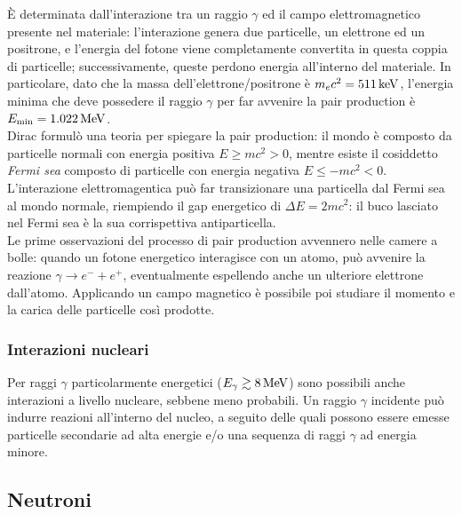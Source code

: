 È determinata dall'interazione tra un raggio $ \gamma $ ed il campo elettromagnetico presente nel materiale: l'interazione genera due particelle, un elettrone ed un positrone, e l'energia del fotone viene completamente convertita in questa coppia di particelle; successivamente, queste perdono energia all'interno del materiale. In particolare, dato che la massa dell'elettrone/positrone è $ m_ec^2 = 511\,\mathrm{keV} $, l'energia minima che deve possedere il raggio $ \gamma $ per far avvenire la pair production è $ E_{\text{min}} = 1.022\,\mathrm{MeV} $.\\
Dirac formulò una teoria per spiegare la pair production: il mondo è composto da particelle normali con energia positiva $ E \ge m c^2 > 0 $, mentre esiste il cosiddetto \textit{Fermi sea} composto di particelle con energia negativa $ E \le - m c^2 < 0 $. L'interazione elettromagentica può far transizionare una particella dal Fermi sea al mondo normale, riempiendo il gap energetico di $ \Delta E = 2mc^2 $: il buco lasciato nel Fermi sea è la sua corrispettiva antiparticella.\\
Le prime osservazioni del processo di pair production avvennero nelle camere a bolle: quando un fotone energetico interagisce con un atomo, può avvenire la reazione $ \gamma \rightarrow e^- + e^+ $, eventualmente espellendo anche un ulteriore elettrone dall'atomo. Applicando un campo magnetico è possibile poi studiare il momento e la carica delle particelle così prodotte.

\subsubsection{Interazioni nucleari}

Per raggi $ \gamma $ particolarmente energetici ($ E_{\gamma} \gtrsim 8\,\mathrm{MeV} $) sono possibili anche interazioni a livello nucleare, sebbene meno probabili. Un raggio $ \gamma $ incidente può indurre reazioni all'interno del nucleo, a seguito delle quali possono essere emesse particelle secondarie ad alta energie e/o una sequenza di raggi $ \gamma $ ad energia minore.

\subsection{Neutroni}

